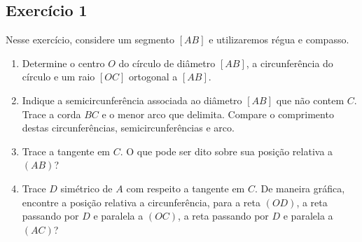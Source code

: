 \begin{center}
\end{center}

\subsection*{Exercício 1}

Nesse exercício, considere um segmento $[AB]$ e utilizaremos régua e compasso.

\begin{center}
\end{center}

\begin{enumerate}
\item Determine o centro $O$ do círculo de diâmetro $[AB]$, a
circunferência do círculo e um raio $[OC]$ ortogonal a $[AB]$.

\item Indique a semicircunferência associada ao diâmetro $[AB]$ que não contem
  $C$. Trace a corda $BC$ e o menor arco que delimita.
  Compare o comprimento destas circunferências, semicircunferências e arco.

\item Trace a tangente em $C$. O que pode ser dito sobre sua posição relativa a $(AB)$?

\item Trace $D$ simétrico de $A$ com respeito a tangente em $C$.
  De maneira gráfica, encontre a posição relativa a circunferência, para
  a reta $(OD)$, a reta passando por $D$ e paralela a $(OC)$,
  a reta passando por $D$ e paralela a $(AC)$?
\end{enumerate}

